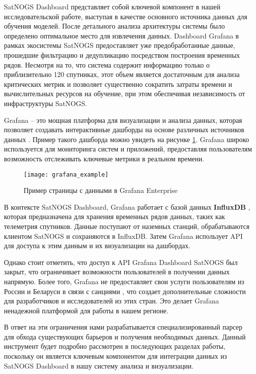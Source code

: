 SatNOGS Dashboard представляет собой ключевой компонент в нашей
исследовательской работе, выступая в качестве основного источника данных для
обучения моделей. После детального анализа архитектуры системы было определено
оптимальное место для извлечения данных. Dashboard Grafana в рамках экосистемы
SatNOGS предоставляет уже предобработанные данные, прошедшие фильтрацию и
дедупликацию посредством построения временных рядов. Несмотря на то, что
система содержит информацию только о приблизительно 120 спутниках, этот объем
является достаточным для анализа критических метрик и позволяет существенно
сократить затраты времени и вычислительных ресурсов на обучение, при этом
обеспечивая независимость от инфраструктуры SatNOGS.

Grafana -- это мощная платформа для визуализации и анализа данных, которая
позволяет создавать интерактивные дашборды на основе различных источников
данных \cite{grafana_docs}. Пример такого дашборда можно увидеть на рисунке
\ref{fig:grafana_example}.
Grafana широко используется для мониторинга систем и приложений, предоставляя
пользователям возможность отслеживать ключевые метрики в реальном времени.

\begin{figure}[H]
	\centering
	\texttt{[image: grafana\_example]}
	\caption{Пример страницы с данными в Grafana Enterprise}
	\label{fig:grafana_example}
\end{figure}

В контексте SatNOGS Dashboard, Grafana работает с базой данных
\textbf{InfluxDB} \cite{influxdb_docs}, которая предназначена для хранения
временных рядов данных, таких как телеметрия спутников. Данные поступают от
наземных станций, обрабатываются клиентом SatNOGS и сохраняются в InfluxDB.
Затем Grafana использует API для доступа к этим данным и их визуализации на
дашбордах.

Однако стоит отметить, что доступ к API Grafana Dashboard SatNOGS был закрыт,
что ограничивает возможности пользователей в получении данных напрямую. Более
того, Grafana не предоставляет свои услуги пользователям из России и Беларуси в
связи с санциями \cite{grafana_community_post}, что создает дополнительные
сложности для разработчиков и исследователей из этих стран. Это делает Grafana
ненадежной платформой для работы в нашем регионе.

В ответ на эти ограничения нами разрабатывается специализированный парсер для
обхода существующих барьеров и получения необходимых данных. Данный инструмент
будет подробно рассмотрен в последующих разделах работы, поскольку он является
ключевым компонентом для интеграции данных из SatNOGS Dashboard в нашу систему
анализа и визуализации.

